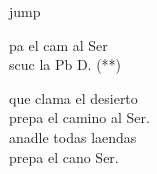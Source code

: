 \begin{cancion}jump\\
	\begin{chorus}%
		pa el cam al Ser\\
		scuc la Pb  D. (**)\jump\\
	\end{chorus}%
	 que clama el desierto\\
	prepa el camino al Ser.\\
	anadle todas laendas\\
	prepa el cano  Ser.\\
\end{cancion}%
